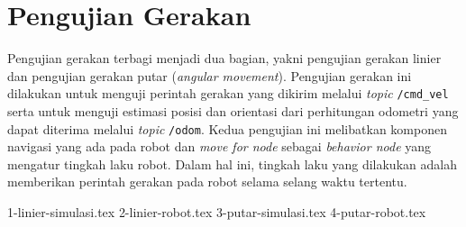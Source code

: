 \section{Pengujian Gerakan}
\label{sec:pengujiangerakan}

Pengujian gerakan terbagi menjadi dua bagian,
  yakni pengujian gerakan linier dan pengujian gerakan putar (\emph{angular movement}).
Pengujian gerakan ini dilakukan untuk menguji perintah gerakan yang dikirim melalui \emph{topic} \lstinline{/cmd_vel} serta untuk menguji estimasi posisi dan orientasi dari perhitungan odometri yang dapat diterima melalui \emph{topic} \lstinline{/odom}.
Kedua pengujian ini melibatkan komponen navigasi yang ada pada robot dan \emph{move for node} sebagai \emph{behavior node} yang mengatur tingkah laku robot.
Dalam hal ini, tingkah laku yang dilakukan adalah memberikan perintah gerakan pada robot selama selang waktu tertentu.

{1-linier-simulasi.tex}
{2-linier-robot.tex}
{3-putar-simulasi.tex}
{4-putar-robot.tex}
